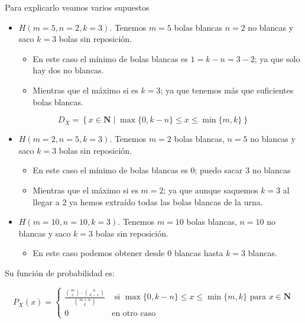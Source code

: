 \documentclass[]{book}
\providecommand{\tightlist}{%
  \setlength{\itemsep}{0pt}\setlength{\parskip}{0pt}}
\begin{document}
Para explicarlo veamos varios supuestos

\begin{itemize}
\tightlist
\item
  \(H(m=5,n=2,k=3)\). Tenemos \(m=5\) bolas blancas \(n=2\) no blancas y saco \(k=3\) bolas sin reposición.

  \begin{itemize}
  \tightlist
  \item
    En este caso el mínimo de bolas blancas es \(1=k-n=3-2\); ya que solo hay dos no blancas.
  \item
    Mientras que el máximo si es \(k=3\); ya que tenemos más que suficientes bolas blancas.
  \end{itemize}
\end{itemize}

\[D_X=\left\{x\in\mathbf{N}\mid \max\{0,k-n\}\leq  x \leq \min\{m,k\}\right\}\]

\begin{itemize}
\tightlist
\item
  \(H(m=2,n=5,k=3)\). Tenemos \(m=2\) bolas blancas, \(n=5\) no blancas y saco \(k=3\) bolas sin reposición.

  \begin{itemize}
  \tightlist
  \item
    En este caso el mínimo de bolas blancas es \(0\); puedo sacar 3 no blancas
  \item
    Mientras que el máximo si es \(m=2\); ya que aunque saquemos \(k=3\) al llegar a 2 ya hemos extraído todas las bolas blancas de la urna.
  \end{itemize}
\item
  \(H(m=10,n=10,k=3)\). Tenemos \(m=10\) bolas blancas, \(n=10\) no blancas y saco \(k=3\) bolas sin reposición.

  \begin{itemize}
  \tightlist
  \item
    En este caso podemos obtener desde \(0\) blancas hasta \(k=3\) blancas.
  \end{itemize}
\end{itemize}

Su función de probabilidad es:

\[
P_{X}(x)=\left\{
\begin{array}{ll}
\frac{\binom{m}{x}\cdot \binom{n}{k-x}}{\binom{m+n}{k}} & \mbox{ si }
\max\{0,k-n\}\leq x \leq \min\{m,k\} \mbox { para  } x\in \mathbf{N}\\
0  & \mbox{en otro caso}\end{array}\right.
\]
\end{document}
